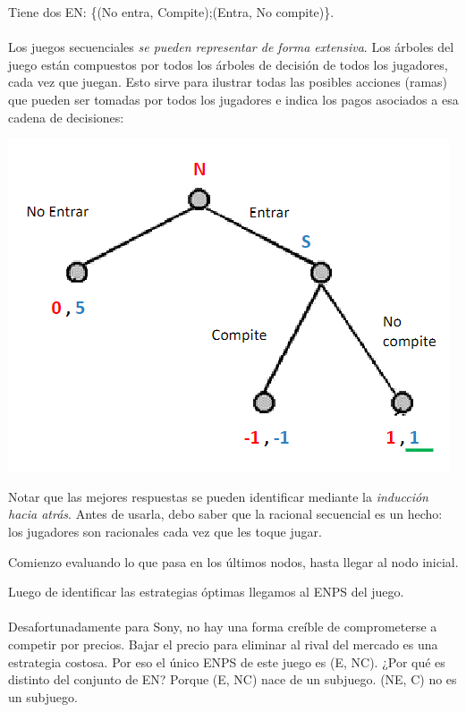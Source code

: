 \documentclass{article}
\begin{document}
                Tiene dos EN: \{(No entra, Compite);(Entra, No compite)\}. \\
                \\
                Los juegos secuenciales \emph{se pueden representar de forma extensiva}. Los árboles del juego están compuestos por todos los árboles de decisión de todos los jugadores, cada vez que juegan. Esto sirve para ilustrar todas las posibles acciones (ramas) que pueden ser tomadas por todos los jugadores e indica los pagos asociados a esa cadena de decisiones:
                \begin{center}
                    \includegraphics[width=0.5 \linewidth]{figs/secuenciales.png}
                \end{center}
                Notar que las mejores respuestas se pueden identificar mediante la \emph{inducción hacia atrás}. Antes de usarla, debo saber que la racional secuencial es un hecho: los jugadores son racionales cada vez que les toque jugar.
                
                Comienzo evaluando lo que pasa en los últimos nodos, hasta llegar al nodo inicial.

                Luego de identificar las estrategias óptimas llegamos al ENPS del juego. \\
                \\
                Desafortunadamente para Sony, no hay una forma creíble de comprometerse a competir por precios. Bajar el precio para eliminar al rival del mercado es una estrategia costosa. Por eso el único ENPS de este juego es (E, NC). ¿Por qué es distinto del conjunto de EN? Porque (E, NC) nace de un subjuego. (NE, C) no es un subjuego. 
\end{document}

